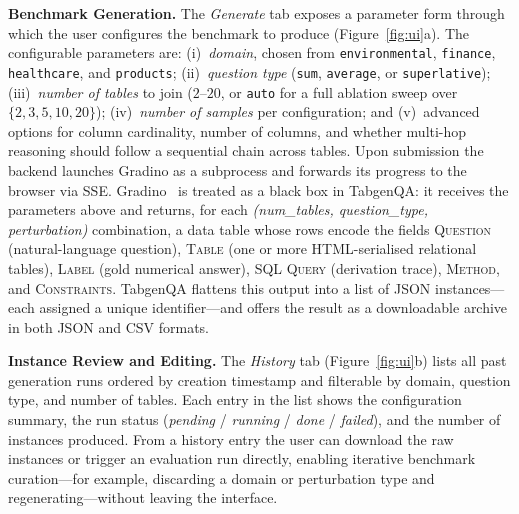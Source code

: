\smallskip\noindent\textbf{Benchmark Generation.}
The \emph{Generate} tab exposes a parameter form through which the user
configures the benchmark to produce (Figure~\ref{fig:ui}a).
The configurable parameters are:
(i)~\emph{domain}, chosen from
  \texttt{environmental}, \texttt{finance},
  \texttt{healthcare}, and \texttt{products};
(ii)~\emph{question type} (\texttt{sum}, \texttt{average}, or
  \texttt{superlative});
(iii)~\emph{number of tables} to join
  ($2$–$20$, or \texttt{auto} for a full ablation sweep over
  $\{2,3,5,10,20\}$);
(iv)~\emph{number of samples} per configuration; and
(v)~advanced options for column cardinality, number of columns, and
  whether multi-hop reasoning should follow a sequential chain across
  tables.
Upon submission the backend launches Gradino as a subprocess and forwards
its progress to the browser via SSE.
Gradino~\cite{gradino} is treated as a black box in TabgenQA: it receives
the parameters above and returns, for each
\emph{(num\_tables, question\_type, perturbation)} combination, a data
table whose rows encode the fields
\textsc{Question} (natural-language question),
\textsc{Table} (one or more HTML-serialised relational tables),
\textsc{Label} (gold numerical answer),
\textsc{SQL Query} (derivation trace),
\textsc{Method}, and \textsc{Constraints}.
TabgenQA flattens this output into a list of JSON instances—each
assigned a unique identifier—and offers the result as a downloadable
archive in both JSON and CSV formats.

\smallskip\noindent\textbf{Instance Review and Editing.}
The \emph{History} tab (Figure~\ref{fig:ui}b) lists all past generation
runs ordered by creation timestamp and filterable by domain, question
type, and number of tables.
Each entry in the list shows the configuration summary, the run status
(\emph{pending} / \emph{running} / \emph{done} / \emph{failed}), and the
number of instances produced.
From a history entry the user can download the raw instances or trigger
an evaluation run directly, enabling iterative benchmark curation—for
example, discarding a domain or perturbation type and regenerating—without
leaving the interface.

